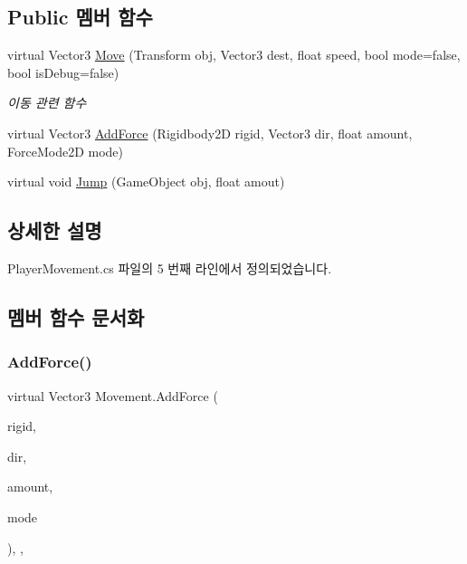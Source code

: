 \subsection*{Public 멤버 함수}
\begin{DoxyCompactItemize}
\item 
virtual Vector3 \mbox{\hyperlink{class_movement_ad400f155e0556a5e22a74cb77858460a}{Move}} (Transform obj, Vector3 dest, float speed, bool mode=false, bool is\+Debug=false)
\begin{DoxyCompactList}\small\item\em 이동 관련 함수 \end{DoxyCompactList}\item 
virtual Vector3 \mbox{\hyperlink{class_movement_ab0b20a2f058e2eed15f4bdf0503a2566}{Add\+Force}} (Rigidbody2D rigid, Vector3 dir, float amount, Force\+Mode2D mode)
\item 
virtual void \mbox{\hyperlink{class_movement_a496c630807c87a286fb53070b4ed6cf1}{Jump}} (Game\+Object obj, float amout)
\end{DoxyCompactItemize}


\subsection{상세한 설명}


Player\+Movement.\+cs 파일의 5 번째 라인에서 정의되었습니다.



\subsection{멤버 함수 문서화}
\mbox{\label{class_movement_ab0b20a2f058e2eed15f4bdf0503a2566}} 
\subsubsection{\texorpdfstring{AddForce()}{AddForce()}}
{\footnotesize\ttfamily virtual Vector3 Movement.\+Add\+Force (\begin{DoxyParamCaption}\item[{Rigidbody2D}]{rigid,  }\item[{Vector3}]{dir,  }\item[{float}]{amount,  }\item[{Force\+Mode2D}]{mode }\end{DoxyParamCaption})\hspace{0.3cm}{\ttfamily [inline]}, {\ttfamily [virtual]}, {\ttfamily [inherited]}}



